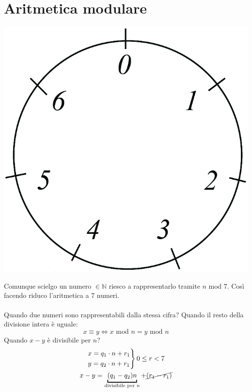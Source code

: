 \documentclass[italian]{article}
\begin{document}
\section{Aritmetica modulare}
\begin{center}
	\includegraphics[width=0.2\linewidth]{img/aritmetica_modulare_mod7.png}
\end{center}
Comunque scielgo un numero $\in \mathbb{N}$ riesco a rappresentarlo tramite $n \text{ mod } 7$. Così facendo riduco l'aritmetica a 7 numeri. \\\\
Quando due numeri sono rappresentabili dalla stessa cifra? Quando il resto della divisione intera è uguale:
\[
	x\equiv y \Leftrightarrow x \text{ mod } n = y \text{ mod } n
\]
Quando $x-y$ è divisibile per $n$?
\begin{gather*}
	\begin{rcases*}
		x = q_1 \cdot n + r_1 \\
		y = q_2 \cdot n + r_1
	\end{rcases*} 0 \leq r < 7\\
	x-y = \underbracket{(q_1 - q_2)n}_{\text{divisibile per $n$}} + \cancel{(r_1-r_1)}
\end{gather*}
\end{document}
